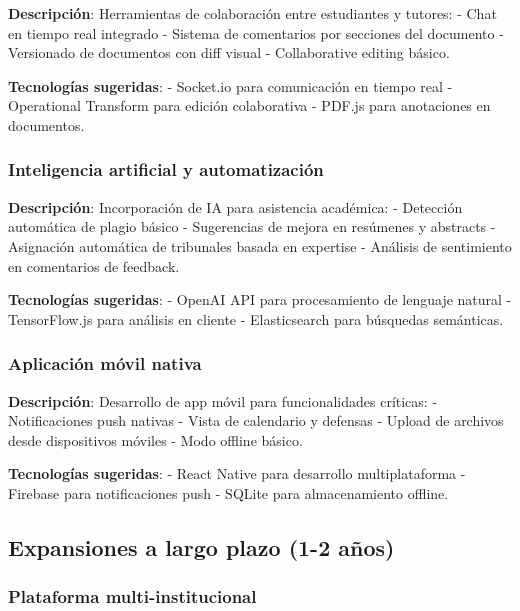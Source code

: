 \documentclass[12pt,a4paper,oneside]{report}
\begin{document}
{\textbf{Descripción}: Herramientas de colaboración entre estudiantes y
tutores: - Chat en tiempo real integrado - Sistema de comentarios por
secciones del documento - Versionado de documentos con diff visual -
Collaborative editing básico.

\textbf{Tecnologías sugeridas}: - Socket.io para comunicación en tiempo
real - Operational Transform para edición colaborativa - PDF.js para
anotaciones en documentos.

\subsubsection{Inteligencia artificial y
automatización}\label{inteligencia-artificial-y-automatizaciuxf3n}

\textbf{Descripción}: Incorporación de IA para asistencia académica: -
Detección automática de plagio básico - Sugerencias de mejora en
resúmenes y abstracts - Asignación automática de tribunales basada en
expertise - Análisis de sentimiento en comentarios de feedback.

\textbf{Tecnologías sugeridas}: - OpenAI API para procesamiento de
lenguaje natural - TensorFlow.js para análisis en cliente -
Elasticsearch para búsquedas semánticas.

\subsubsection{Aplicación móvil
nativa}\label{aplicaciuxf3n-muxf3vil-nativa}

\textbf{Descripción}: Desarrollo de app móvil para funcionalidades
críticas: - Notificaciones push nativas - Vista de calendario y defensas
- Upload de archivos desde dispositivos móviles - Modo offline básico.

\textbf{Tecnologías sugeridas}: - React Native para desarrollo
multiplataforma - Firebase para notificaciones push - SQLite para
almacenamiento offline.

\subsection{Expansiones a largo plazo (1-2
años)}\label{expansiones-a-largo-plazo-1-2-auxf1os}

\subsubsection{Plataforma
multi-institucional}\label{plataforma-multi-institucional}

}
\end{document}
